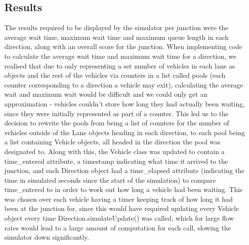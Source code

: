 \documentclass{article}
\begin{document}
    \subsection{Results}
    The results required to be displayed by the simulator per junction were the average wait time, maximum wait time and
    maximum queue length in each direction, along with an overall score for the junction. When implementing code to
    calculate the average wait time and maximum wait time for a direction, we realised that due to only representing a
    set number of vehicles in each lane as objects and the rest of the vehicles via counters in a list called pools
    (each counter corresponding to a direction a vehicle may exit), calculating the average wait and maximum wait would
    be difficult and we could only get an approximation - vehicles couldn’t store how long they had actually been waiting,
    since they were initially represented as part of a counter. This led us to the decision to rewrite the pools from being
    a list of counters for the number of vehicles outside of the Lane objects heading in each direction, to each pool being
    a list containing Vehicle objects, all headed in the direction the pool was designated to. Along with this, the Vehicle
    class was updated to contain a time\_entered attribute, a timestamp indicating what time it arrived to the junction,
    and each Direction object had a time\_elapsed attribute (indicating the time in simulated seconds since the start of
    the simulation) to compare time\_entered to in order to work out how long a vehicle had been waiting. This was chosen
    over each vehicle having a timer keeping track of how long it had been at the junction for, since this would have
    required updating every Vehicle object every time Direction.simulateUpdate() was called, which for large flow rates
    would lead to a large amount of computation for each call, slowing the simulator down significantly.
\end{document}
